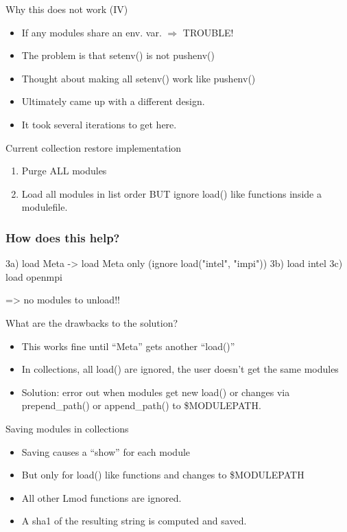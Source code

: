 \documentclass{beamer}
\begin{document}
\begin{frame}{Why this does not work (IV)}
  \begin{itemize}
    \item If any modules share an env. var. $\Rightarrow$ TROUBLE!
    \item The problem is that setenv() is not pushenv()
    \item Thought about making all setenv() work like pushenv()
    \item Ultimately came up with a different design. 
    \item It took several iterations to get here.
  \end{itemize}
\end{frame}

\begin{frame}{Current collection restore implementation}
  \begin{enumerate}
    \item Purge ALL modules
    \item Load all modules in list order BUT ignore load() like
      functions inside a modulefile.
  \end{enumerate}
\end{frame}

\begin{frame}[fragile]
  \frametitle{How does this help?}
    {\small
\begin{semiverbatim}
   
3a) load Meta
    -> load Meta only (ignore load("intel", "impi"))
3b) load intel
3c) load openmpi

=> no modules to unload!!
\end{semiverbatim}
    }
\end{frame}

\begin{frame}{What are the drawbacks to the solution?}
  \begin{itemize}
    \item This works fine until ``Meta'' gets another ``load()''
    \item In collections, all load() are ignored,
      the user doesn't get the same modules
    \item Solution: error out when modules get new load() or changes
      via prepend\_path() or append\_path() to \$MODULEPATH.
  \end{itemize}
\end{frame}

\begin{frame}{Saving modules in collections}
  \begin{itemize}
    \item Saving causes a ``show'' for each module
    \item But only for load() like functions and changes to \$MODULEPATH
    \item All other Lmod functions are ignored. 
    \item A sha1 of the resulting string is computed and saved.
  \end{itemize}
\end{frame}
\end{document}
